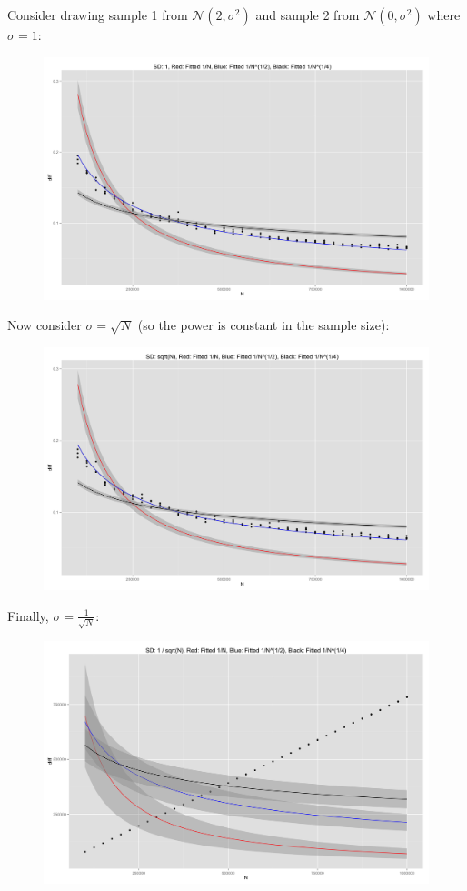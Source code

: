 \documentclass{amsart}
\begin{document}
Consider drawing sample 1 from $\mathcal{N}(2, \sigma^2)$ and sample 2
from $\mathcal{N}(0, \sigma^2)$ where $\sigma = 1$:
\begin{figure}[!ht]
  \centering
  \includegraphics[scale=.06]{rate_plot_1.png}
\end{figure}

Now consider $\sigma = \sqrt{N}$ (so the power is constant in the
sample size):
\begin{figure}[!ht]
  \centering
  \includegraphics[scale=.06]{rate_plot_2.png}
\end{figure}

Finally, $\sigma = \frac{1}{\sqrt{N}}$:
\begin{figure}[!ht]
  \centering
  \includegraphics[scale=.06]{rate_plot_3.png}
\end{figure}
\end{document}
